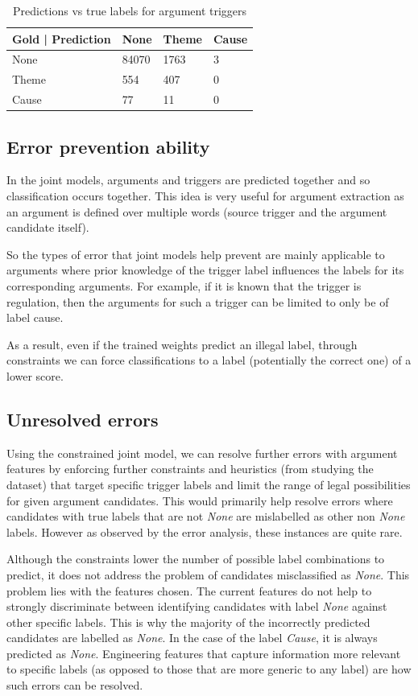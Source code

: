 \documentclass{article} %
\begin{document}
\begin{table}[htb]
\centering
\caption{Predictions vs true labels for argument triggers}
\label{table:args_results}
\begin{tabular}{|l|l|l|l|}
\hline
Gold | Prediction & None & Theme & Cause \\ \hline
None & 84070 & 1763 & 3 \\ \hline
Theme & 554 & 407 & 0 \\ \hline
Cause & 77 & 11 & 0 \\ \hline
\end{tabular}
\end{table}

\subsection{Error prevention ability}
In the joint models, arguments and triggers are predicted together and so classification occurs together. This idea is very useful for argument extraction as an argument is defined over multiple words (source trigger and the argument candidate itself).

So the types of error that joint models help prevent are mainly applicable to arguments where prior knowledge of the trigger label influences the labels for its corresponding arguments. For example, if it is known that the trigger is regulation, then the arguments for such a trigger can be limited to only be of label cause. 

As a result, even if the trained weights predict an illegal label, through constraints we can force classifications to a label (potentially the correct one) of a lower score.


\subsection{Unresolved errors}
Using the constrained joint model, we can resolve further errors with argument features by enforcing further constraints and heuristics (from studying the dataset) that target specific trigger labels and limit the range of legal possibilities for given argument candidates. This would primarily help resolve errors where candidates with true labels that are not \emph{None} are mislabelled as other non \emph{None} labels. However as observed by the error analysis, these instances are quite rare. 

Although the constraints lower the number of possible label combinations to predict, it does not address the problem of candidates misclassified as \emph{None}. This problem lies with the features chosen. The current features do not help to strongly discriminate between identifying candidates with label \emph{None} against other specific labels. This is why the majority of the incorrectly predicted candidates are labelled as \emph{None}. In the case of the label \emph{Cause}, it is always predicted as \emph{None}. Engineering features that capture information more relevant to specific labels (as opposed to those that are more generic to any label) are how such errors can be resolved.
\end{document}
